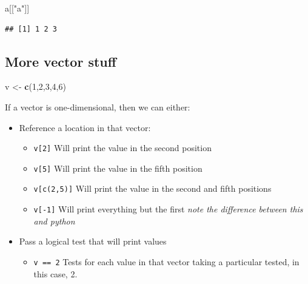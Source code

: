 \documentclass[
]{book}
\newenvironment{Shaded}{\begin{snugshade}}{\end{snugshade}}
\newcommand{\DecValTok}[1]{\textcolor[rgb]{0.00,0.00,0.81}{#1}}
\newcommand{\KeywordTok}[1]{\textcolor[rgb]{0.13,0.29,0.53}{\textbf{#1}}}
\newcommand{\NormalTok}[1]{#1}
\newcommand{\StringTok}[1]{\textcolor[rgb]{0.31,0.60,0.02}{#1}}
\providecommand{\tightlist}{%
  \setlength{\itemsep}{0pt}\setlength{\parskip}{0pt}}
\begin{document}
\begin{Shaded}
\begin{Highlighting}[]
\NormalTok{  a[[}\StringTok{"a"}\NormalTok{]]}
\end{Highlighting}
\end{Shaded}

\begin{verbatim}
## [1] 1 2 3
\end{verbatim}

\hypertarget{more-vector-stuff}{%
\subsection{More vector stuff}\label{more-vector-stuff}}

\begin{Shaded}
\begin{Highlighting}[]
\NormalTok{v <-}\StringTok{ }\KeywordTok{c}\NormalTok{(}\DecValTok{1}\NormalTok{,}\DecValTok{2}\NormalTok{,}\DecValTok{3}\NormalTok{,}\DecValTok{4}\NormalTok{,}\DecValTok{6}\NormalTok{)}
\end{Highlighting}
\end{Shaded}

If a vector is one-dimensional, then we can either:

\begin{itemize}
\tightlist
\item
  Reference a location in that vector:

  \begin{itemize}
  \tightlist
  \item
    \texttt{v{[}2{]}} Will print the value in the second position
  \item
    \texttt{v{[}5{]}} Will print the value in the fifth position
  \item
    \texttt{v{[}c(2,5){]}} Will print the value in the second and fifth positions
  \item
    \texttt{v{[}-1{]}} Will print everything but the first \emph{note the difference between this and python}
  \end{itemize}
\item
  Pass a logical test that will print values

  \begin{itemize}
  \tightlist
  \item
    \texttt{v\ ==\ 2} Tests for each value in that vector taking a particular tested, in this case, 2.
  \end{itemize}
\end{itemize}
\end{document}
